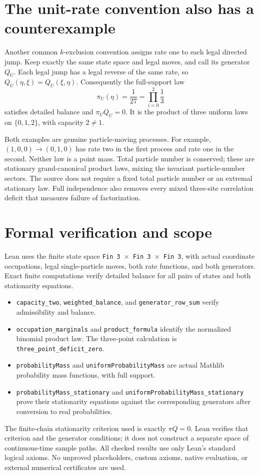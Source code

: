 \documentclass[11pt]{article}
\begin{document}
\newpage
\section{The unit-rate convention also has a counterexample}
Another common $k$-exclusion convention assigns rate one to each legal
directed jump. Keep exactly the same state space and legal moves, and call
its generator $Q_U$. Each legal jump has a legal reverse of the same rate,
so $Q_U(\eta,\xi)=Q_U(\xi,\eta)$. Consequently the full-support law
\[
 \pi_U(\eta)=\frac1{27}=\prod_{i=0}^2\frac13
\]
satisfies detailed balance and $\pi_U Q_U=0$. It is the product of three
uniform laws on $\{0,1,2\}$, with capacity $2\ne1$.

Both examples are genuine particle-moving processes. For example,
$(1,0,0)\to(0,1,0)$ has rate two in the first process and rate one in the
second. Neither law is a point mass. Total particle number is conserved;
these are stationary grand-canonical product laws, mixing the invariant
particle-number sectors. The source does not require a fixed total particle
number or an extremal stationary law. Full independence also removes every
mixed three-site correlation deficit that measures failure of factorization.

\section{Formal verification and scope}
Lean uses the finite state space \texttt{Fin 3 $\times$ Fin 3 $\times$ Fin 3},
with actual coordinate occupations, legal single-particle moves, both rate
functions, and both generators. Exact finite computations verify detailed
balance for all pairs of states and both stationarity equations.

\begingroup\raggedright
\begin{itemize}
\setlength{\itemsep}{3pt}
\item \texttt{capacity\_\allowbreak two}, \texttt{weighted\_\allowbreak balance}, and
\texttt{generator\_\allowbreak row\_\allowbreak sum} verify admissibility and balance.
\item \texttt{occupation\_\allowbreak marginals} and \texttt{product\_\allowbreak formula}
identify the normalized binomial product law. The three-point calculation
is \texttt{three\_\allowbreak point\_\allowbreak deficit\_\allowbreak zero}.
\item \texttt{probabilityMass} and \texttt{uniformProbabilityMass} are actual
Mathlib probability mass functions, with full support.
\item \texttt{probabilityMass\_\allowbreak stationary} and
\texttt{uniformProbabilityMass\_\allowbreak stationary} prove their stationarity
equations against the corresponding generators after conversion to real
probabilities.
\end{itemize}
\endgroup
The finite-chain stationarity criterion used is exactly $\pi Q=0$.
Lean verifies that criterion and the generator conditions; it does not
construct a separate space of continuous-time sample paths.
All checked results use only Lean's standard logical axioms. No
unproved placeholders, custom axioms, native evaluation, or external
numerical certificates are used.
\end{document}
